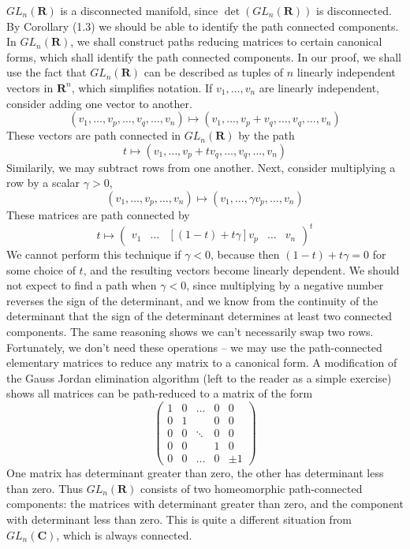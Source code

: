 \begin{example}
    $GL_n(\mathbf{R})$ is a disconnected manifold, since $\det(GL_n(\mathbf{R}))$ is disconnected. By Corollary (1.3) we should be able to identify the path connected components. In $GL_n(\mathbf{R})$, we shall construct paths reducing matrices to certain canonical forms, which shall identify the path connected components. In our proof, we shall use the fact that $GL_n(\mathbf{R})$ can be described as tuples of $n$ linearly independent vectors in $\mathbf{R}^n$, which simplifies notation. If $v_1, \dots, v_n$ are linearly independent, consider adding one vector to another.
    \[ (v_1, \dots, v_p, \dots, v_q, \dots, v_n) \mapsto (v_1, \dots, v_p + v_q, \dots, v_q, \dots, v_n) \]
    These vectors are path connected in $GL_n(\mathbf{R})$ by the path
    \[ t \mapsto (v_1, \dots, v_p + t v_q, \dots, v_q, \dots, v_n) \]
    Similarily, we may subtract rows from one another. Next, consider multiplying a row by a scalar $\gamma > 0$,
    \[ (v_1, \dots, v_p, \dots, v_n) \mapsto (v_1, \dots, \gamma v_p, \dots, v_n) \]
    These matrices are path connected by
    \[ t \mapsto \begin{pmatrix} v_1 & \dots & [(1-t) + t \gamma]v_p & \dots & v_n \end{pmatrix}^t \]
    We cannot perform this technique if $\gamma < 0$, because then $(1-t) + t \gamma = 0$ for some choice of $t$, and the resulting vectors become linearly dependent. We should not expect to find a path when $\gamma < 0$, since multiplying by a negative number reverses the sign of the determinant, and we know from the continuity of the determinant that the sign of the determinant determines at least two connected components. The same reasoning shows we can't necessarily swap two rows. Fortunately, we don't need these operations -- we may use the path-connected elementary matrices to reduce any matrix to a canonical form. A modification of the Gauss Jordan elimination algorithm (left to the reader as a simple exercise) shows all matrices can be path-reduced to a matrix of the form
    \[ \begin{pmatrix} 1 & 0 & \dots & 0 & 0 \\ 0 & 1 & & 0 & 0 \\ 0 & 0 & \ddots & 0 & 0 \\ 0 & 0 &  & 1 & 0 \\ 0 & 0 & \dots & 0 & \pm 1 \end{pmatrix} \]
    One matrix has determinant greater than zero, the other has determinant less than zero. Thus $GL_n(\mathbf{R})$ consists of two homeomorphic path-connected components: the matrices with determinant greater than zero, and the component with determinant less than zero. This is quite a different situation from $GL_n(\mathbf{C})$, which is always connected.
\end{example}






